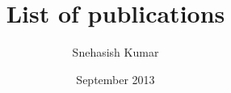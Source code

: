 \documentclass[12pt]{article}
\title{List of publications}
\author{Snehasish Kumar}
\date{September 2013}
\begin{document}
\maketitle %
\vspace{10pt}

\nocite{amoeba,protozoa,mici}


\footnotesize{}
\end{document}
